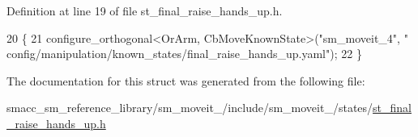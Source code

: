 Definition at line 19 of file st\+\_\+final\+\_\+raise\+\_\+hands\+\_\+up.\+h.


\begin{DoxyCode}
20     \{
21         configure\_orthogonal<OrArm, CbMoveKnownState>(\textcolor{stringliteral}{"sm\_moveit\_4"}, \textcolor{stringliteral}{"
      config/manipulation/known\_states/final\_raise\_hands\_up.yaml"});
22     \}
\end{DoxyCode}


The documentation for this struct was generated from the following file\+:\begin{DoxyCompactItemize}
\item 
smacc\+\_\+sm\+\_\+reference\+\_\+library/sm\+\_\+moveit\+\_/include/sm\+\_\+moveit\+\_/states/\hyperlink{st__final__raise__hands__up_8h}{st\+\_\+final\+\_\+raise\+\_\+hands\+\_\+up.\+h}\end{DoxyCompactItemize}
